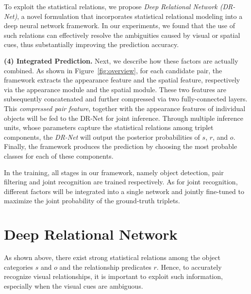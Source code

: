 \documentclass[10pt,twocolumn,letterpaper]{article}
\begin{document}
To exploit the statistical relations, we propose 
\emph{Deep Relational Network (DR-Net)},
a novel formulation that incorporates statistical relational modeling
into a deep neural network framework. 
In our experiments, we found that the use of such relations can effectively
resolve the ambiguities caused by visual or spatial cues, thus
substantially improving the prediction accuracy.

\textbf{(4) Integrated Prediction.}%
Next, we describe how these factors are actually combined.
As shown in Figure~\ref{fig:overview},
for each candidate pair, the framework extracts the appearance 
feature and the spatial feature, respectively via the 
appearance module and the spatial module. 
These two features are subsequently concatenated and further compressed
via two fully-connected layers.
This \emph{compressed pair feature}, together with the appearance features
of individual objects will be fed to the DR-Net for joint inference.
Through multiple inference units, whose parameters capture the 
statistical relations among triplet components, 
the \emph{DR-Net} will output the posterior probabilities of $s$, $r$, and $o$.
Finally, the framework produces the prediction by choosing
the most probable classes for each of these components. 

In the training, all stages in our framework, 
namely object detection, pair filtering and joint recognition are trained respectively.
As for joint recognition,
different factors will be integrated into a single network and jointly fine-tuned to 
maximize the joint probability of the ground-truth triplets.


\section{Deep Relational Network}\label{sec:drnet}

As shown above, there exist strong statistical relations among 
the object categories $s$ and $o$ and the relationship predicates $r$. 
Hence, to accurately recognize visual relationships, it is important
to exploit such information, especially when the visual cues are ambiguous.
 
\end{document}
